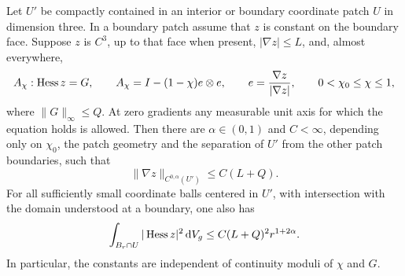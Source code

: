 \begin{lemma}\label{n3:existence:gradient}
Let $U'$ be compactly contained in an interior or boundary coordinate
patch $U$ in dimension three.  In a boundary patch assume that $z$ is
constant on the boundary face.  Suppose $z$ is $C^3$, up to that face when present,
$|\nabla z|\le L$, and, almost everywhere,
\begin{equation}\label{n3:existence:axial-equation}
 A_\chi:\operatorname{Hess} z=G,\qquad
 A_\chi=I-(1-\chi)e\otimes e,\qquad
 e=\frac{\nabla z}{|\nabla z|},\qquad
 0<\chi_0\le\chi\le1,
\end{equation}
where $\|G\|_\infty\le Q$.  At zero gradients any measurable unit
axis for which the equation holds is allowed.  Then there are
$\alpha\in(0,1)$ and $C<\infty$, depending only on $\chi_0$, the
patch geometry and the separation of $U'$ from the other patch
boundaries, such that
\begin{equation}\label{n3:existence:gradient-estimate}
 \|\nabla z\|_{C^{0,\alpha}(U')}
 \le C(L+Q).
\end{equation}
For all sufficiently small coordinate balls centered in $U'$,
with intersection with the domain understood at a boundary, one also
has
\begin{equation}\label{n3:existence:hessian-morrey}
 \int_{B_r\cap U}|\operatorname{Hess} z|^2\,\mathrm d V_g
 \le C(L+Q)^2r^{1+2\alpha}.
\end{equation}
In particular, the constants are independent of continuity moduli of
$\chi$ and $G$.
\end{lemma}

